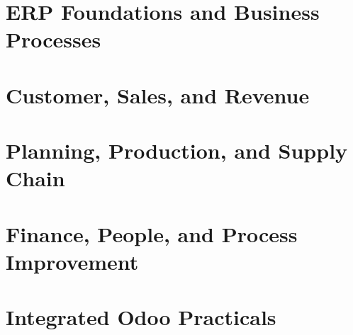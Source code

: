 \documentclass[11pt,oneside,a4paper]{report}
\begin{document}


\cleardoublepage
{}

\part{ERP Foundations and Business Processes}



\part{Customer, Sales, and Revenue}



\part{Planning, Production, and Supply Chain}




\part{Finance, People, and Process Improvement}




\part{Integrated Odoo Practicals}












\end{document}
